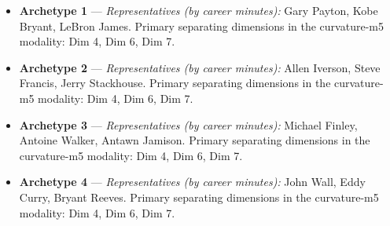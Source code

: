 \begin{itemize}
\item \textbf{Archetype 1} --- \emph{Representatives (by career minutes):} Gary Payton, Kobe Bryant, LeBron James. Primary separating dimensions in the curvature-m5 modality: Dim 4, Dim 6, Dim 7.
\item \textbf{Archetype 2} --- \emph{Representatives (by career minutes):} Allen Iverson, Steve Francis, Jerry Stackhouse. Primary separating dimensions in the curvature-m5 modality: Dim 4, Dim 6, Dim 7.
\item \textbf{Archetype 3} --- \emph{Representatives (by career minutes):} Michael Finley, Antoine Walker, Antawn Jamison. Primary separating dimensions in the curvature-m5 modality: Dim 4, Dim 6, Dim 7.
\item \textbf{Archetype 4} --- \emph{Representatives (by career minutes):} John Wall, Eddy Curry, Bryant Reeves. Primary separating dimensions in the curvature-m5 modality: Dim 4, Dim 6, Dim 7.
\end{itemize}
